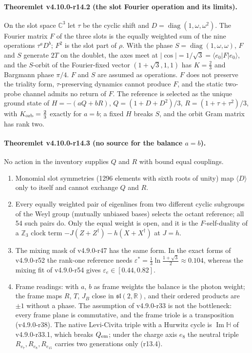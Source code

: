 \paragraph{Theoremlet v4.10.0-r14.2 (the slot Fourier operation and its limits).}
On the slot space \(\mathbb C^3\) let \(\tau\) be the cyclic shift and \(D=\operatorname{diag}(1,\omega,\omega^2)\).  The Fourier
matrix \(F\) of the three slots is the equally weighted sum of the nine operations \(\tau^aD^b\); \(F^2\) is the slot part of
\(\rho\).  With the phase \(S=\operatorname{diag}(1,\omega,\omega)\), \(F\) and \(S\) generate \(2T\) on the doublet, the axes meet
at \(|\cos|=1/\sqrt3=\langle e_0|F|e_0\rangle\), and the \(S\)-orbit of the Fourier-fixed vector \((1+\sqrt3,1,1)\) has
\(K=\tfrac23\) and Bargmann phase \(\pi/4\).  \(F\) and \(S\) are assumed as operations.  \(F\) does not preserve the triality
form, \(\tau\)-preserving dynamics cannot produce \(F\), and the static two-probe channel admits no return of \(F\).  The
reference is selected as the unique ground state of \(H=-(aQ+bR)\), \(Q=(1+D+D^2)/3\), \(R=(1+\tau+\tau^2)/3\), with
\(K_{\rm orb}=\tfrac23\) exactly for \(a=b\); a fixed \(H\) breaks \(S\), and the orbit Gram matrix has rank two.

\paragraph{Theoremlet v4.10.0-r14.3 (no source for the balance \(a=b\)).}
No action in the inventory supplies \(Q\) and \(R\) with bound equal couplings.
\begin{enumerate}[leftmargin=2em]
\item[(a)] Monomial slot symmetries (1296 elements with sixth roots of unity) map \(\langle D\rangle\) only to itself and cannot
exchange \(Q\) and \(R\).
\item[(b)] Every equally weighted pair of eigenlines from two different cyclic subgroups of the Weyl group (mutually
unbiased bases) selects the octant reference; all 54 such pairs do.  Only the equal weight is open, and it is the
\(F\)-self-duality of a \(\mathbb Z_3\) clock term \(-J(Z+Z^\dagger)-h(X+X^\dagger)\) at \(J=h\).
\item[(c)] The mixing mask of v4.9.0-r47 has the same form.  In the exact forms of v4.9.0-r52 the rank-one reference
needs \(\varepsilon^*=\tfrac13\ln\frac{1+\sqrt3}{2}\approx0.104\), whereas the mixing fit of v4.9.0-r54 gives
\(\varepsilon_e\in[0.44,0.82]\).
\item[(d)] Frame readings: with \(a\), \(b\) as frame weights the balance is the photon weight; the frame maps \(R\), \(T\),
\(J_B\) close in \(\mathfrak{sl}(2,\mathbb R)\), and their ordered products are \(\pm1\) without a phase.  The assumption of
v4.9.0-r33 is not the bottleneck: every frame plane is commutative, and the frame triole is a transposition (v4.9.0-r38).
The native Levi-Civita triple with a Hurwitz cycle is \(\operatorname{Im}\mathbb H\) of v4.9.0-r33.1, which breaks \(Q_{\rm em}\);
under the charge axis \(e_8\) the neutral triple \(R_{e_7},R_{e_8},R_{e_{15}}\) carries two generations only (r13.4).
\end{enumerate}

